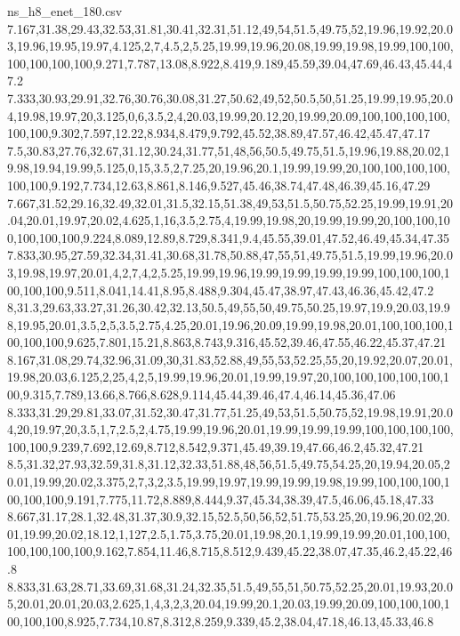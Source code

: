 \begin{filecontents*}[overwrite]{ns_h8_enet_180.csv}
7.167,31.38,29.43,32.53,31.81,30.41,32.31,51.12,49,54,51.5,49.75,52,19.96,19.92,20.03,19.96,19.95,19.97,4.125,2,7,4.5,2,5.25,19.99,19.96,20.08,19.99,19.98,19.99,100,100,100,100,100,100,9.271,7.787,13.08,8.922,8.419,9.189,45.59,39.04,47.69,46.43,45.44,47.2
7.333,30.93,29.91,32.76,30.76,30.08,31.27,50.62,49,52,50.5,50,51.25,19.99,19.95,20.04,19.98,19.97,20,3.125,0,6,3.5,2,4,20.03,19.99,20.12,20,19.99,20.09,100,100,100,100,100,100,9.302,7.597,12.22,8.934,8.479,9.792,45.52,38.89,47.57,46.42,45.47,47.17
7.5,30.83,27.76,32.67,31.12,30.24,31.77,51,48,56,50.5,49.75,51.5,19.96,19.88,20.02,19.98,19.94,19.99,5.125,0,15,3.5,2,7.25,20,19.96,20.1,19.99,19.99,20,100,100,100,100,100,100,9.192,7.734,12.63,8.861,8.146,9.527,45.46,38.74,47.48,46.39,45.16,47.29
7.667,31.52,29.16,32.49,32.01,31.5,32.15,51.38,49,53,51.5,50.75,52.25,19.99,19.91,20.04,20.01,19.97,20.02,4.625,1,16,3.5,2.75,4,19.99,19.98,20,19.99,19.99,20,100,100,100,100,100,100,9.224,8.089,12.89,8.729,8.341,9.4,45.55,39.01,47.52,46.49,45.34,47.35
7.833,30.95,27.59,32.34,31.41,30.68,31.78,50.88,47,55,51,49.75,51.5,19.99,19.96,20.03,19.98,19.97,20.01,4,2,7,4,2,5.25,19.99,19.96,19.99,19.99,19.99,19.99,100,100,100,100,100,100,9.511,8.041,14.41,8.95,8.488,9.304,45.47,38.97,47.43,46.36,45.42,47.2
8,31.3,29.63,33.27,31.26,30.42,32.13,50.5,49,55,50,49.75,50.25,19.97,19.9,20.03,19.98,19.95,20.01,3.5,2,5,3.5,2.75,4.25,20.01,19.96,20.09,19.99,19.98,20.01,100,100,100,100,100,100,9.625,7.801,15.21,8.863,8.743,9.316,45.52,39.46,47.55,46.22,45.37,47.21
8.167,31.08,29.74,32.96,31.09,30,31.83,52.88,49,55,53,52.25,55,20,19.92,20.07,20.01,19.98,20.03,6.125,2,25,4,2,5,19.99,19.96,20.01,19.99,19.97,20,100,100,100,100,100,100,9.315,7.789,13.66,8.766,8.628,9.114,45.44,39.46,47.4,46.14,45.36,47.06
8.333,31.29,29.81,33.07,31.52,30.47,31.77,51.25,49,53,51.5,50.75,52,19.98,19.91,20.04,20,19.97,20,3.5,1,7,2.5,2,4.75,19.99,19.96,20.01,19.99,19.99,19.99,100,100,100,100,100,100,9.239,7.692,12.69,8.712,8.542,9.371,45.49,39.19,47.66,46.2,45.32,47.21
8.5,31.32,27.93,32.59,31.8,31.12,32.33,51.88,48,56,51.5,49.75,54.25,20,19.94,20.05,20.01,19.99,20.02,3.375,2,7,3,2,3.5,19.99,19.97,19.99,19.99,19.98,19.99,100,100,100,100,100,100,9.191,7.775,11.72,8.889,8.444,9.37,45.34,38.39,47.5,46.06,45.18,47.33
8.667,31.17,28.1,32.48,31.37,30.9,32.15,52.5,50,56,52,51.75,53.25,20,19.96,20.02,20.01,19.99,20.02,18.12,1,127,2.5,1.75,3.75,20.01,19.98,20.1,19.99,19.99,20.01,100,100,100,100,100,100,9.162,7.854,11.46,8.715,8.512,9.439,45.22,38.07,47.35,46.2,45.22,46.8
8.833,31.63,28.71,33.69,31.68,31.24,32.35,51.5,49,55,51,50.75,52.25,20.01,19.93,20.05,20.01,20.01,20.03,2.625,1,4,3,2,3,20.04,19.99,20.1,20.03,19.99,20.09,100,100,100,100,100,100,8.925,7.734,10.87,8.312,8.259,9.339,45.2,38.04,47.18,46.13,45.33,46.8

\end{filecontents*}
